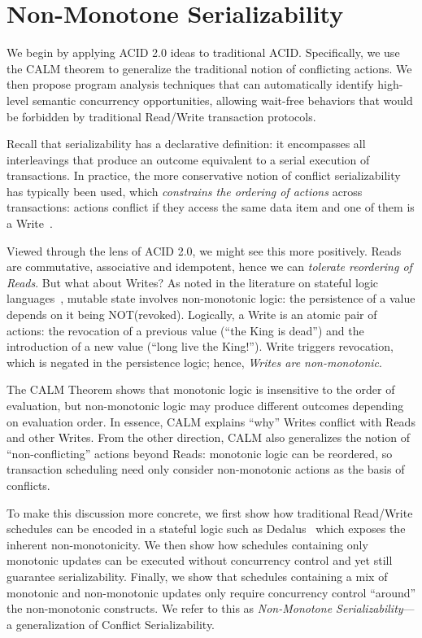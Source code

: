 \documentclass{sig-alternate}
\begin{document}
\section{Non-Monotone Serializability}
We begin by applying ACID 2.0 ideas to traditional ACID.  Specifically, we use the CALM theorem to generalize the traditional notion of conflicting actions.  We then propose program analysis techniques that can automatically identify high-level semantic concurrency opportunities, allowing wait-free behaviors that would be forbidden by traditional Read/Write transaction protocols.

Recall that serializability has a declarative definition: it encompasses all interleavings
that produce an outcome equivalent to a serial execution of transactions.  In
practice, the more conservative notion of conflict serializability has typically
been used, which \emph{constrains the ordering of actions} across transactions:
actions conflict if they access the same data item and one of them is a
Write~\cite{Eswaran1976}.  

Viewed through the lens of ACID 2.0, we might see this more positively.  Reads are commutative, associative and idempotent, hence we can \emph{tolerate reordering of Reads}.  But what about Writes? 
As noted in the literature on stateful logic languages~\cite{dedalus,statelog}, mutable state 
involves non-monotonic logic: the persistence of a value depends on it being
NOT(revoked). Logically, a Write is an atomic pair of actions: the revocation of a previous
value (``the King is dead'') and the introduction of a new value (``long live the King!''). 
Write triggers revocation, which is negated in the persistence logic; hence, \emph{Writes are non-monotonic}.

The CALM Theorem shows that monotonic logic is insensitive to the order of evaluation, but non-monotonic logic may produce different outcomes depending on evaluation order.  
In essence, CALM explains ``why'' Writes conflict with Reads and other Writes.
From the other direction, CALM also generalizes the notion of ``non-conflicting'' actions beyond Reads: monotonic logic can be reordered, so transaction scheduling need only consider non-monotonic actions as the basis of conflicts.

To make this discussion more concrete, we first show how traditional Read/Write
schedules can be encoded in a stateful logic such as Dedalus~\cite{dedalus} which exposes 
the inherent non-monotonicity. We
then show how schedules containing only monotonic updates can be executed
without concurrency control and yet still guarantee serializability. Finally, we
show that schedules containing a mix of monotonic and non-monotonic updates only
require concurrency control ``around'' the non-monotonic constructs. We refer to
this as \emph{Non-Monotone Serializability}---a generalization of Conflict Serializability.
\end{document}
